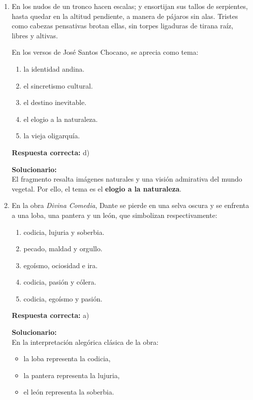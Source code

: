 \begin{enumerate}
	
	
	\item En los nudos de un tronco hacen escalas; y ensortijan sus tallos de serpientes, hasta quedar en la altitud pendiente, a manera de pájaros sin alas. Tristes como cabezas pensativas brotan ellas, sin torpes ligaduras de tirana raíz, libres y altivas.
	
	En los versos de José Santos Chocano, se aprecia como tema:
	
	\begin{enumerate}[label=\alph*)]
		\item la identidad andina.
		\item el sincretismo cultural.
		\item el destino inevitable.
		\item el elogio a la naturaleza.
		\item la vieja oligarquía.
	\end{enumerate}
	\textbf{Respuesta correcta:} d)
	
	\vspace{2mm}
	\textbf{Solucionario:}\\
	El fragmento resalta imágenes naturales y una visión admirativa del mundo vegetal.  
	Por ello, el tema es el \textbf{elogio a la naturaleza}.
	
	\vspace{6mm}
	
	\item En la obra \textit{Divina Comedia}, Dante se pierde en una selva oscura y se enfrenta a una loba, una pantera y un león, que simbolizan respectivamente:
	\begin{enumerate}[label=\alph*)]
		\item codicia, lujuria y soberbia.
		\item pecado, maldad y orgullo.
		\item egoísmo, ociosidad e ira.
		\item codicia, pasión y cólera.
		\item codicia, egoísmo y pasión.
	\end{enumerate}
	\textbf{Respuesta correcta:} a)
	
	\vspace{2mm}
	\textbf{Solucionario:}\\
	En la interpretación alegórica clásica de la obra:
	\begin{itemize}
		\item la loba representa la codicia,
		\item la pantera representa la lujuria,
		\item el león representa la soberbia.
	\end{itemize}
	
	\vspace{6mm}
	
\end{enumerate}

